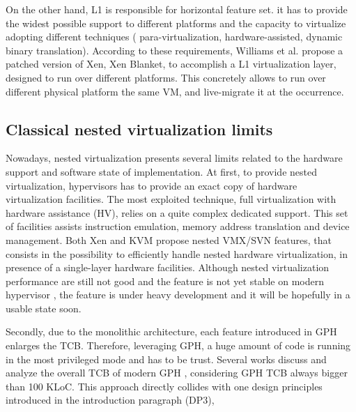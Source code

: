 \documentclass{sig-alternate}
\begin{document}
On the other hand, L1 is responsible for horizontal feature set. it has to provide the widest possible support to different platforms and the capacity to virtualize adopting different techniques ( para-virtualization, hardware-assisted, dynamic binary translation). According to these requirements, Williams et al. \cite{art:blan} propose a patched version of Xen, Xen Blanket, to accomplish a L1 virtualization layer, designed to run over different platforms. This concretely allows to run over different physical platform the same VM, and live-migrate it at the occurrence.

\subsection{Classical nested virtualization limits}

Nowadays, nested virtualization presents several limits related to the hardware support and software state of implementation. At first, to provide nested virtualization, hypervisors has to provide an exact copy of hardware virtualization facilities. The most exploited technique, full virtualization with hardware assistance (HV), relies on a quite complex dedicated support.
This set of facilities assists instruction emulation, memory address translation and device management. Both Xen and KVM propose nested VMX/SVN features, that consists in the possibility to efficiently handle nested hardware virtualization, in presence of a single-layer hardware facilities.
Although nested virtualization performance are still not good and the feature is not yet stable on modern hypervisor \cite{xen:test}, the feature is under heavy development and it will be hopefully in a usable state soon.

Secondly, due to the monolithic architecture, each feature introduced in GPH enlarges the TCB. Therefore, leveraging GPH, a huge amount of code is running in the most privileged mode and has to be trust. Several works discuss and analyze the overall TCB of modern GPH \cite{nova, xmhf}, considering GPH TCB always bigger than 100 KLoC. This approach directly collides with one design principles introduced in the introduction paragraph (DP3), 
\end{document}
